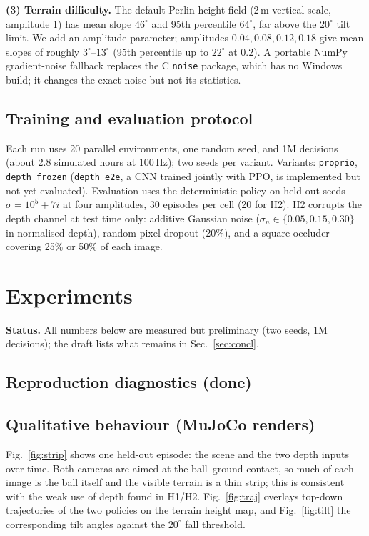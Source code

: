 \documentclass[conference]{IEEEtran}
\begin{document}
\textbf{(3) Terrain difficulty.} The default Perlin height field (2\,m vertical scale, amplitude 1) has mean slope $46^\circ$ and 95th percentile $64^\circ$, far above the $20^\circ$ tilt limit. We add an amplitude parameter; amplitudes $0.04, 0.08, 0.12, 0.18$ give mean slopes of roughly $3^\circ$--$13^\circ$ (95th percentile up to $22^\circ$ at $0.2$). A portable NumPy gradient-noise fallback replaces the C \texttt{noise} package, which has no Windows build; it changes the exact noise but not its statistics.

\subsection{Training and evaluation protocol}
Each run uses 20 parallel environments, one random seed, and 1M decisions (about 2.8 simulated hours at 100\,Hz); two seeds per variant. Variants: \texttt{proprio}, \texttt{depth\_frozen} (\texttt{depth\_e2e}, a CNN trained jointly with PPO, is implemented but not yet evaluated). Evaluation uses the deterministic policy on held-out seeds $\sigma=10^5+7i$ at four amplitudes, 30 episodes per cell (20 for H2). H2 corrupts the depth channel at test time only: additive Gaussian noise ($\sigma_n\in\{0.05,0.15,0.30\}$ in normalised depth), random pixel dropout (20\%), and a square occluder covering 25\% or 50\% of each image.

\section{Experiments}\label{sec:exp}
\textbf{Status.} All numbers below are measured but preliminary (two seeds, 1M decisions); the draft lists what remains in Sec.~\ref{sec:concl}.

\subsection{Reproduction diagnostics (done)}


\subsection{Qualitative behaviour (MuJoCo renders)}
Fig.~\ref{fig:strip} shows one held-out episode: the scene and the two depth inputs over time. Both cameras are aimed at the ball--ground contact, so much of each image is the ball itself and the visible terrain is a thin strip; this is consistent with the weak use of depth found in H1/H2. Fig.~\ref{fig:traj} overlays top-down trajectories of the two policies on the terrain height map, and Fig.~\ref{fig:tilt} the corresponding tilt angles against the $20^\circ$ fall threshold.
\end{document}
